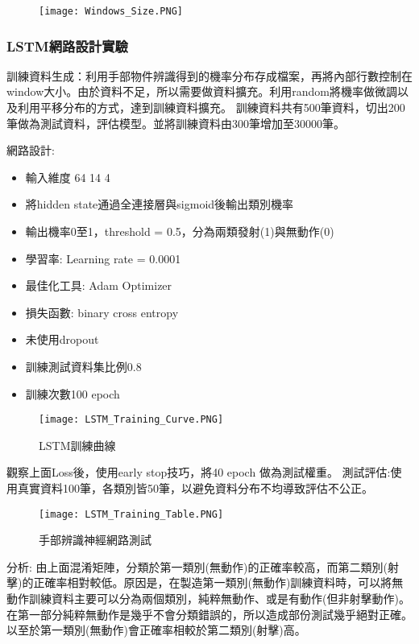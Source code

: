 \begin{figure}[H]
    \centering
    \texttt{[image: Windows\_Size.PNG]}
    \caption{}
\end{figure}

\subsubsection{LSTM網路設計實驗}

訓練資料生成：利用手部物件辨識得到的機率分布存成檔案，再將內部行數控制在window大小。由於資料不足，所以需要做資料擴充。利用random將機率做微調以及利用平移分布的方式，達到訓練資料擴充。
訓練資料共有500筆資料，切出200筆做為測試資料，評估模型。並將訓練資料由300筆增加至30000筆。

網路設計:
\begin{itemize}
\item 輸入維度  64 14 4
\item 將hidden state通過全連接層與sigmoid後輸出類別機率
\item 輸出機率0至1，threshold = 0.5，分為兩類發射(1)與無動作(0)
\item 學習率: Learning rate = 0.0001
\item 最佳化工具: Adam Optimizer
\item 損失函數: binary cross entropy
\item 未使用dropout
\item 訓練測試資料集比例0.8
\item 訓練次數100 epoch
\end{itemize}

\begin{figure}[H]
    \centering
    \texttt{[image: LSTM\_Training\_Curve.PNG]}
    \caption{LSTM訓練曲線}
    \label{fig:LSTM訓練曲線}
\end{figure}

觀察上面Loss後，使用early stop技巧，將40 epoch 做為測試權重。
測試評估:使用真實資料100筆，各類別皆50筆，以避免資料分布不均導致評估不公正。

\begin{figure}[H]
    \centering
    \texttt{[image: LSTM\_Training\_Table.PNG]}
    \caption{手部辨識神經網路測試}
    \label{fig:手部辨識神經網路測試}
\end{figure}

分析:
由上面混淆矩陣，分類於第一類別(無動作)的正確率較高，而第二類別(射擊)的正確率相對較低。原因是，在製造第一類別(無動作)訓練資料時，可以將無動作訓練資料主要可以分為兩個類別，純粹無動作、或是有動作(但非射擊動作)。在第一部分純粹無動作是幾乎不會分類錯誤的，所以造成部份測試幾乎絕對正確。以至於第一類別(無動作)會正確率相較於第二類別(射擊)高。


